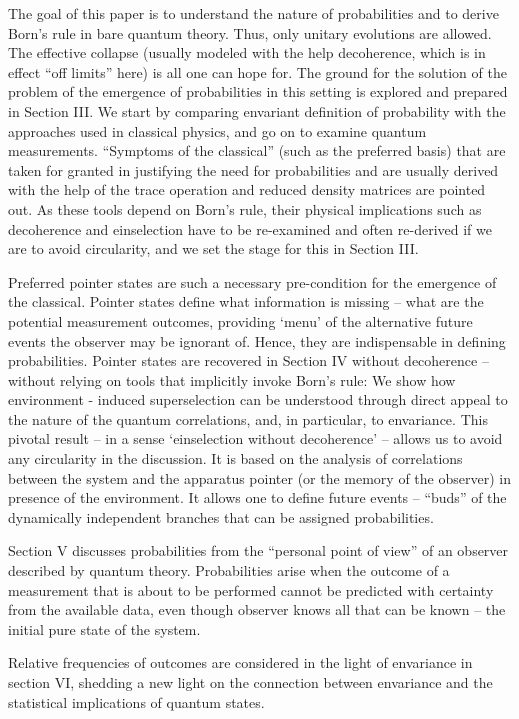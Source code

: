 \documentclass[aps,twocolumn,pra,epsfig]{revtex4}
\begin{document}
The goal of this paper is to understand the nature of probabilities 
and to derive Born's rule in bare quantum theory. Thus, only unitary 
evolutions are allowed. The effective collapse (usually modeled 
with the help decoherence, which is in effect  ``off limits'' here) is all
one can hope for. The ground for the solution of the problem of the emergence
of probabilities in this setting is explored and prepared in Section III.
We start by comparing envariant definition of probability with the approaches
used in classical physics, and go on to examine quantum measurements.
``Symptoms of the classical''  (such as the preferred basis) that are taken 
for granted in justifying the need for probabilities and are usually derived with
the help of the trace operation and reduced density matrices are pointed out. 
As these tools depend on Born's rule, their physical implications such as 
decoherence and einselection have to be re-examined and often re-derived 
if we are to avoid circularity, and we set the stage for this in Section III.

Preferred pointer states are such a necessary pre-condition for the emergence
of the classical. Pointer states define what information is missing -- what are 
the potential measurement outcomes, providing `menu' of the alternative future 
events the observer may be ignorant of. Hence, they are indispensable in defining
probabilities. Pointer states are recovered in Section IV without decoherence
-- without relying on tools that implicitly invoke Born's rule: We show how
environment - induced superselection can be understood through direct appeal 
to the nature of the quantum correlations, and, in particular, to envariance. 
This pivotal result -- in a sense `einselection without decoherence' -- allows us 
to avoid any circularity in the discussion. It is based on the analysis
of correlations between the system and the apparatus pointer (or the memory
of the observer) in presence of the environment. It allows one to define future
events --  ``buds'' of the dynamically independent branches that can be assigned
probabilities.

Section V discusses probabilities from the ``personal point of view'' of 
an observer described by quantum theory.  Probabilities arise when 
the outcome of a measurement that is about to be performed cannot 
be predicted with certainty from the available data, even though observer 
knows all that can be known -- the initial pure state of the system.  

Relative frequencies of outcomes are considered
in the light of envariance in section VI, shedding a new light on
the connection between envariance and the statistical implications
of quantum states.
\end{document}
